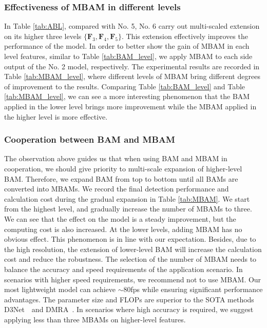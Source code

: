 \documentclass[journal]{IEEEtran}
\newcommand{\tabref}[1]{Table \ref{#1}}
\newcommand{\DMRA}{DMRA~\cite{piao2019depth}}
\newcommand{\DTNet}{D3Net~\cite{fan2019D3Net}}
\begin{document}
\subsubsection{Effectiveness of MBAM in different levels}
\label{sec:abl_mbam}
In \tabref{tab:ABL},
compared with No. 5, No. 6 carry out multi-scaled extension on its higher three levels $\{\mathbf{F}_3,\mathbf{F}_4,\mathbf{F}_5\}$.
This extension effectively improves the performance of the model.
In order to better show the gain of MBAM in each level features, similar to \tabref{tab:BAM_level}, 
we apply MBAM to each side output of the No. 2 model, respectively.
The experimental results are recorded in \tabref{tab:MBAM_level}, where
different levels of MBAM bring different degrees of improvement to the results.
Comparing \tabref{tab:BAM_level} and \tabref{tab:MBAM_level}, 
we can see a more interesting phenomenon that 
the BAM applied in the lower level brings more improvement 
while the MBAM applied in the higher level is more effective.

\subsubsection{Cooperation between BAM and MBAM}
The observation above guides us that when using BAM and MBAM in cooperation, 
we should give priority to multi-scale expansion of higher-level BAM.
Therefore, we expand BAM from top to bottom until all BAMs are converted into MBAMs.
We record the final detection performance and calculation cost during the gradual expansion in \tabref{tab:MBAM}.
We start from the highest level,
and gradually increase the number of MBAMs to three.
We can see that the effect on the model is a steady improvement, but the computing cost is also increased.
At the lower levels, adding MBAM has no obvious effect.
This phenomenon is in line with our expectation.
Besides, due to the high resolution, 
the extension of lower-level BAM will increase the calculation cost and reduce the robustness.
The selection of the number of MBAM needs to balance the accuracy and speed requirements of the application scenario.
In scenarios with higher speed requirements, we recommend not to use MBAM. 
Our most lightweight model can achieve $\sim$80fps while ensuring significant performance advantages.
The parameter size and FLOPs are superior to the SOTA methods \DTNet~and \DMRA.
In scenarios where high accuracy is required, we suggest applying less than three MBAMs on higher-level features.
\end{document}
